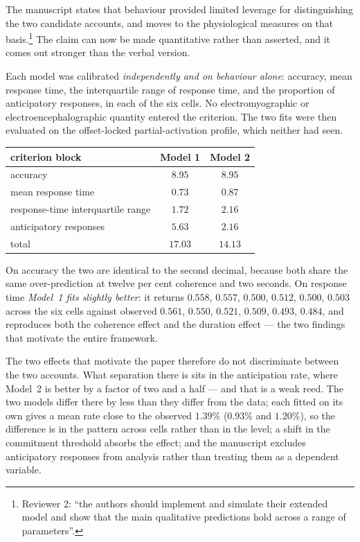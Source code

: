 \documentclass[a4paper,11pt]{article}
\newcommand{\RR}[1]{\textcolor{refcol}{#1}}
\newcommand{\NN}[1]{\textcolor{newcol}{#1}}
\newcommand{\refnote}[1]{\footnote{\textcolor{refcol}{\textsf{\footnotesize #1}}}}
\newcommand{\1}{\mathbbm{1}}
\begin{document}
\RR{The manuscript states that behaviour provided limited leverage for distinguishing
the two candidate accounts, and moves to the physiological measures on that
basis.}\refnote{Reviewer 2: ``the authors should implement and simulate their extended
model and show that the main qualitative predictions hold across a range of
parameters''.} \RR{The claim can now be made quantitative rather than asserted, and it
comes out stronger than the verbal version.}

Each model was calibrated \emph{independently and on behaviour alone}: accuracy, mean
response time, the interquartile range of response time, and the proportion of
anticipatory responses, in each of the six cells. No electromyographic or
electroencephalographic quantity entered the criterion. The two fits were then
evaluated on the offset-locked partial-activation profile, which neither had seen.

\begin{center}
\begin{tabular}{lcc}
\toprule
criterion block & Model 1 & Model 2\\
\midrule
accuracy & $8.95$ & $8.95$\\
mean response time & $\mathbf{0.73}$ & $0.87$\\
response-time interquartile range & $\mathbf{1.72}$ & $2.16$\\
anticipatory responses & $5.63$ & $\mathbf{2.16}$\\
\midrule
total & $17.03$ & $14.13$\\
\bottomrule
\end{tabular}
\end{center}

On accuracy the two are identical to the second decimal, because both share the same
over-prediction at twelve per cent coherence and two seconds. On response time
\emph{Model~1 fits slightly better}: it returns $0.558$, $0.557$, $0.500$, $0.512$,
$0.500$, $0.503$ across the six cells against observed $0.561$, $0.550$, $0.521$,
$0.509$, $0.493$, $0.484$, and reproduces both the coherence effect and the duration
effect --- the two findings that motivate the entire framework.

\NN{The two effects that motivate the paper therefore do not discriminate between the
two accounts.} What separation there is sits in the anticipation rate, where Model~2 is
better by a factor of two and a half --- and that is a weak reed. The two models differ
there by less than they differ from the data; each fitted on its own gives a mean rate
close to the observed $1.39\%$ ($0.93\%$ and $1.20\%$), so the difference is in the
pattern across cells rather than in the level; a shift in the commitment threshold
absorbs the effect; and the manuscript excludes anticipatory responses from analysis
rather than treating them as a dependent variable.
\end{document}
